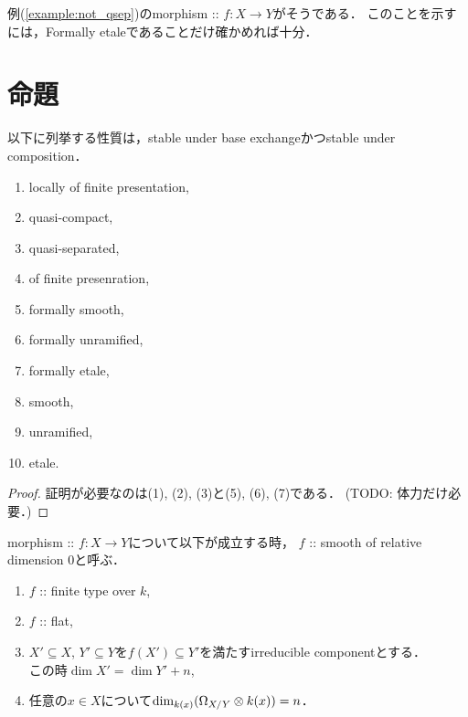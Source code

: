 \documentclass[a4paper]{jsarticle}
\begin{document}
\begin{Example}
    例(\ref{example:not_qsep})のmorphism :: $f \colon X \to Y$がそうである．
    このことを示すには，Formally etaleであることだけ確かめれば十分．
\end{Example}

\section{命題}
\begin{Prop} \label{prop:stable_property}
    以下に列挙する性質は，stable under base exchangeかつstable under composition．
    \begin{enumerate}[label=(\arabic*)]
        \item locally of finite presentation,
        \item quasi-compact,
        \item quasi-separated,
        \item of finite presenration,
        \item formally smooth,
        \item formally unramified,
        \item formally etale,
        \item smooth,
        \item unramified,
        \item etale.
    \end{enumerate}    
\end{Prop}
\begin{proof}
    証明が必要なのは(1), (2), (3)と(5), (6), (7)である．
    (TODO: 体力だけ必要．)
\end{proof}

\begin{Def}
    morphism :: $f \colon X \to Y$について以下が成立する時，
    $f$ :: smooth of relative dimension $0$と呼ぶ．
    \begin{enumerate}
        \item $f$ :: finite type over $k$,
        \item $f$ :: flat,
        \item
            $X' \subseteq X$, $Y' \subseteq Y$を$f(X') \subseteq Y'$を満たすirreducible componentとする． \mbox{} \\
            この時$\dim X'=\dim Y'+n$,
        \item 任意の$x \in X$について$\dim_{k(x)} (\Omega_{X/Y} \otimes k(x))=n$．
    \end{enumerate}
\end{Def}
\end{document}
